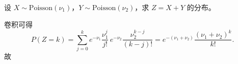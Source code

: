 \begin{question}[10 分]
设 $X\sim \mathrm{Poisson}(\nu_1)$，$Y\sim \mathrm{Poisson}(\nu_2)$，求 $Z=X+Y$ 的分布。
\begin{solution}
卷积可得
\[
P(Z=k)=\sum_{j=0}^{k}e^{-\nu_1}\frac{\nu_1^j}{j!}
\,e^{-\nu_2}\frac{\nu_2^{k-j}}{(k-j)!}
=e^{-(\nu_1+\nu_2)}\frac{(\nu_1+\nu_2)^k}{k!}.
\]
故
\end{solution}
\end{question}


